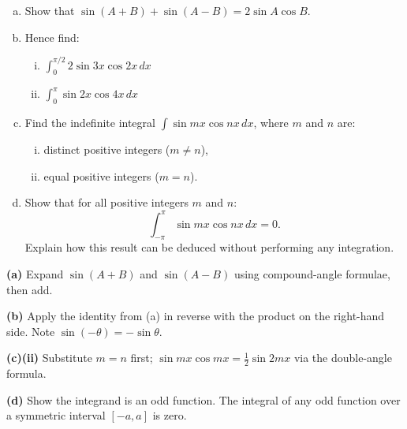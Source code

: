 \begin{problem}
\begin{enumerate}[(a)]
  \item Show that $\sin(A + B) + \sin(A - B) = 2\sin A \cos B$.
  \item Hence find:
    \begin{enumerate}[(i)]
      \item $\displaystyle\int_0^{\pi/2} 2\sin 3x\cos 2x\,dx$
      \item $\displaystyle\int_0^{\pi} \sin 2x\cos 4x\,dx$
    \end{enumerate}
  \item Find the indefinite integral $\int \sin mx\cos nx\,dx$, where $m$ and $n$ are:
    \begin{enumerate}[(i)]
      \item distinct positive integers ($m \neq n$),
      \item equal positive integers ($m = n$).
    \end{enumerate}
  \item Show that for all positive integers $m$ and $n$:
  \[
  \int_{-\pi}^{\pi}\sin mx\cos nx\,dx = 0.
  \]
  Explain how this result can be deduced without performing any integration.
\end{enumerate}
\end{problem}

\begin{hintbox}
\textbf{(a)} Expand $\sin(A+B)$ and $\sin(A-B)$ using compound-angle formulae, then add.

\textbf{(b)} Apply the identity from (a) in reverse with the product on the right-hand side.
Note $\sin(-\theta) = -\sin\theta$.

\textbf{(c)(ii)} Substitute $m = n$ first; $\sin mx\cos mx = \tfrac{1}{2}\sin 2mx$ via the
double-angle formula.

\textbf{(d)} Show the integrand is an odd function.  The integral of any odd function over a
symmetric interval $[-a,a]$ is zero.
\end{hintbox}

